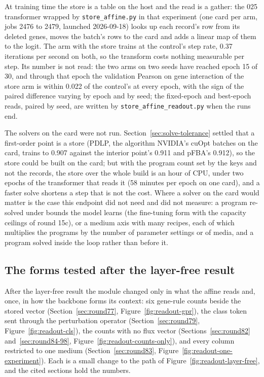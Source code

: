 At training time the store is a table on the host and the read is a gather: the 025
transformer wrapped by \texttt{store\_affine.py} in that experiment (one card per arm,
jobs 2476 to 2479, launched 2026-09-18) looks up each record's row from its deleted
genes, moves the batch's rows to the card and adds a linear map of them to the logit.
The arm with the store trains at the control's step rate, 0.37 iterations per second
on both, so the transform costs nothing measurable per step. Its number is not read:
the two arms on two seeds have reached epoch 15 of 30, and through that epoch the
validation Pearson on gene interaction of the store arm is within 0.022 of the
control's at every epoch, with the sign of the paired difference varying by epoch and
by seed; the fixed-epoch and best-epoch reads, paired by seed, are written by
\texttt{store\_affine\_readout.py} when the runs end.

The solvers on the card were not run. Section~\ref{sec:solve-tolerance} settled that a
first-order point is a store (PDLP, the algorithm NVIDIA's cuOpt batches on the card,
trains to 0.907 against the interior point's 0.911 and pFBA's 0.912), so the store
could be built on the card; but with the program count set by the keys and not the
records, the store over the whole build is an hour of CPU, under two epochs of the
transformer that reads it (58 minutes per epoch on one card), and a faster solve
shortens a step that is not the cost. Where a solver on the card would matter is the
case this endpoint did not need and did not measure: a program re-solved under bounds
the model learns (the fine-tuning form with the capacity ceilings of round 15c), or a
medium axis with many recipes, each of which multiplies the programs by the number of
parameter settings or of media, and a program solved inside the loop rather than
before it.

\subsection{The forms tested after the layer-free result}
\label{sec:forms-after-layer-free}

After the layer-free result the module changed only in what the affine reads and, once,
in how the backbone forms its context: six gene-rule counts beside the stored vector
(Section~\ref{sec:round77}, Figure~\ref{fig:readout-gpr}), the class token sent through
the perturbation operator (Section~\ref{sec:round79}, Figure~\ref{fig:readout-cls}), the
counts with no flux vector (Sections~\ref{sec:round82} and~\ref{sec:round84-98},
Figure~\ref{fig:readout-counts-only}), and every column restricted to one medium
(Section~\ref{sec:round83}, Figure~\ref{fig:readout-one-experiment}). Each is a small
change to the path of Figure~\ref{fig:readout-layer-free}, and the cited sections hold
the numbers.

